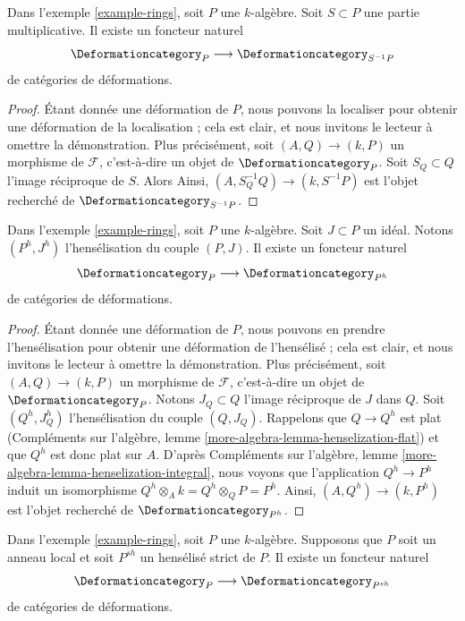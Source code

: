 \begin{lemma}
\label{lemma-localization}
Dans l'exemple \ref{example-rings}, soit $P$ une $k$-algèbre.
Soit $S \subset P$ une partie multiplicative. Il existe un foncteur naturel
$$
\Deformationcategory_P \longrightarrow \Deformationcategory_{S^{-1}P}
$$
de catégories de déformations.
\end{lemma}

\begin{proof}
Étant donnée une déformation de $P$, nous pouvons la localiser
pour obtenir une déformation de la localisation ; cela est
clair, et nous invitons le lecteur à omettre la démonstration. Plus précisément,
soit $(A, Q) \to (k, P)$ un morphisme de $\mathcal{F}$, c'est-à-dire
un objet de $\Deformationcategory_P$. Soit $S_Q \subset Q$ l'image
réciproque de $S$. Alors
Ainsi, $(A, S_Q^{-1}Q) \to (k, S^{-1}P)$
est l'objet recherché de $\Deformationcategory_{S^{-1}P}$.
\end{proof}

\begin{lemma}
\label{lemma-henselization}
Dans l'exemple \ref{example-rings}, soit $P$ une $k$-algèbre.
Soit $J \subset P$ un idéal.
Notons $(P^h, J^h)$ l'hensélisation du couple $(P, J)$.
Il existe un foncteur naturel
$$
\Deformationcategory_P \longrightarrow \Deformationcategory_{P^h}
$$
de catégories de déformations.
\end{lemma}

\begin{proof}
Étant donnée une déformation de $P$, nous pouvons en prendre l'hensélisation
pour obtenir une déformation de l'hensélisé ; cela est
clair, et nous invitons le lecteur à omettre la démonstration. Plus précisément,
soit $(A, Q) \to (k, P)$ un morphisme de $\mathcal{F}$, c'est-à-dire
un objet de $\Deformationcategory_P$. Notons $J_Q \subset Q$ l'image
réciproque de $J$ dans $Q$. Soit $(Q^h, J_Q^h)$ l'hensélisation
du couple $(Q, J_Q)$. Rappelons que $Q \to Q^h$ est plat
(Compléments sur l'algèbre, lemme \ref{more-algebra-lemma-henselization-flat})
et que $Q^h$ est donc plat sur $A$.
D'après Compléments sur l'algèbre, lemme \ref{more-algebra-lemma-henselization-integral},
nous voyons que l'application $Q^h \to P^h$ induit un isomorphisme
$Q^h \otimes_A k = Q^h \otimes_Q P = P^h$.
Ainsi, $(A, Q^h) \to (k, P^h)$ est l'objet recherché de
$\Deformationcategory_{P^h}$.
\end{proof}

\begin{lemma}
\label{lemma-strict-henselization}
Dans l'exemple \ref{example-rings}, soit $P$ une $k$-algèbre.
Supposons que $P$ soit un anneau local et soit $P^{sh}$ un hensélisé strict de $P$.
Il existe un foncteur naturel
$$
\Deformationcategory_P \longrightarrow \Deformationcategory_{P^{sh}}
$$
de catégories de déformations.
\end{lemma}

